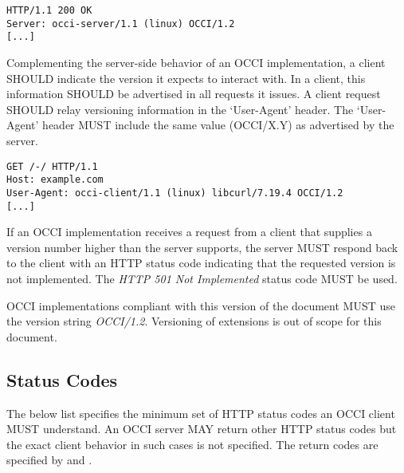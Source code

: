 \documentclass[10pt,a4paper]{article}
\begin{document}
\begin{verbatim}
HTTP/1.1 200 OK
Server: occi-server/1.1 (linux) OCCI/1.2
[...]
\end{verbatim}

Complementing the server-side behavior of an OCCI implementation, a
client SHOULD indicate the version it expects to interact with. In a
client, this information SHOULD be advertised in all requests it issues.
A client request SHOULD relay versioning information in the `User-Agent'
header. The `User-Agent' header MUST include the same value (OCCI/X.Y)
as advertised by the server.

\begin{verbatim}
GET /-/ HTTP/1.1
Host: example.com
User-Agent: occi-client/1.1 (linux) libcurl/7.19.4 OCCI/1.2
[...]
\end{verbatim}

If an OCCI implementation receives a request from a client that
supplies a version number higher than the server supports, the
server MUST respond back to the client with an HTTP status code indicating
that the requested version is not implemented. The \emph{HTTP 501 Not
Implemented} status code MUST be used.

OCCI implementations compliant with this version of the document MUST
use the version string \emph{OCCI/1.2}. Versioning of extensions is
out of scope for this document.

\subsection{Status Codes}
The below list specifies the minimum set of HTTP status codes an OCCI client MUST
understand. An OCCI server MAY return other HTTP status codes but the exact client
behavior in such cases is not specified. The return codes are specified by
\cite{rfc7231} and \cite{rfc7235}.
\end{document}
